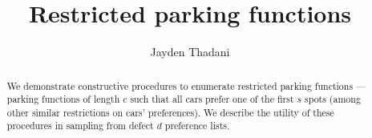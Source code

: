 \documentclass[12pt]{article}
\title{Restricted parking functions}
\author{Jayden Thadani \authornote{1}}
\begin{document}
	\maketitle

	\begin{abstract}
		We demonstrate constructive procedures to enumerate restricted parking functions --- parking functions of length $c$ such that all cars prefer one of the first $s$ spots (among other similar restrictions on cars' preferences). We describe the utility of these procedures in sampling from defect $d$ preference lists. 
	\end{abstract}
\end{document}
